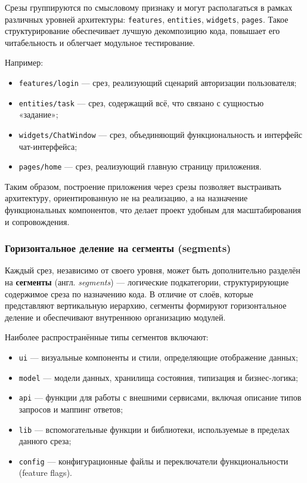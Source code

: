 Срезы группируются по смысловому признаку и могут располагаться в рамках различных уровней архитектуры: \texttt{features}, \texttt{entities}, \texttt{widgets}, \texttt{pages}. Такое структурирование обеспечивает лучшую декомпозицию кода, повышает его читабельность и облегчает модульное тестирование.

Например:
\begin{itemize}
  \item \texttt{features/login} — срез, реализующий сценарий авторизации пользователя;
  \item \texttt{entities/task} — срез, содержащий всё, что связано с сущностью «задание»;
  \item \texttt{widgets/ChatWindow} — срез, объединяющий функциональность и интерфейс чат-интерфейса;
  \item \texttt{pages/home} — срез, реализующий главную страницу приложения.
\end{itemize}

Таким образом, построение приложения через срезы позволяет выстраивать архитектуру, ориентированную не на реализацию, а на назначение функциональных компонентов, что делает проект удобным для масштабирования и сопровождения.

\subsubsection{Горизонтальное деление на сегменты (segments)}

Каждый срез, независимо от своего уровня, может быть дополнительно разделён на \textbf{сегменты} (англ. \textit{segments}) — логические подкатегории, структурирующие содержимое среза по назначению кода. В отличие от слоёв, которые представляют вертикальную иерархию, сегменты формируют горизонтальное деление и обеспечивают внутреннюю организацию модулей.

Наиболее распространённые типы сегментов включают:
\begin{itemize}
  \item \texttt{ui} — визуальные компоненты и стили, определяющие отображение данных;
  \item \texttt{model} — модели данных, хранилища состояния, типизация и бизнес-логика;
  \item \texttt{api} — функции для работы с внешними сервисами, включая описание типов запросов и маппинг ответов;
  \item \texttt{lib} — вспомогательные функции и библиотеки, используемые в пределах данного среза;
  \item \texttt{config} — конфигурационные файлы и переключатели функциональности (feature flags).
\end{itemize}

